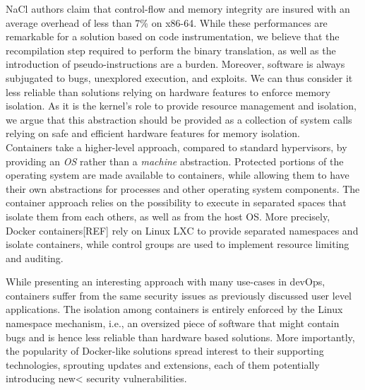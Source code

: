 \documentclass[letterpaper,twocolumn,10pt]{article}
\begin{document}
NaCl authors claim that control-flow and memory integrity are insured with an average overhead of less than 7\% on x86-64.
While these performances are remarkable for a solution based on code instrumentation, we believe that the recompilation step required to perform the binary translation, as well as the introduction of pseudo-instructions are a burden.
Moreover, software is always subjugated to bugs, unexplored execution, and exploits.
We can thus consider it less reliable than solutions relying on hardware features to enforce memory isolation.
As it is the kernel's role to provide resource management and isolation, we argue that this abstraction should be provided as a collection of system calls relying on safe and efficient hardware features for memory isolation. \\

Containers take a higher-level approach, compared to standard hypervisors, by providing an \emph{OS} rather than a \emph{machine} abstraction.
Protected portions of the operating system are made available to containers, while allowing them to have their own abstractions for processes and other operating system components.
The container approach relies on the possibility to execute in separated spaces that isolate them from each others, as well as from the host OS.
More precisely, Docker containers[REF] rely on Linux LXC to provide separated namespaces and isolate containers, while control groups are used to implement resource limiting and auditing.

While presenting an interesting approach with many use-cases in devOps, containers suffer from the same security issues as previously discussed user level applications.
The isolation among containers is entirely enforced by the Linux namespace mechanism, i.e., an oversized piece of software that might contain bugs and is hence less reliable than hardware based solutions.
More importantly, the popularity of Docker-like solutions spread interest to their supporting technologies, sprouting updates and extensions, each of them potentially introducing new< security vulnerabilities.\\
\end{document}
